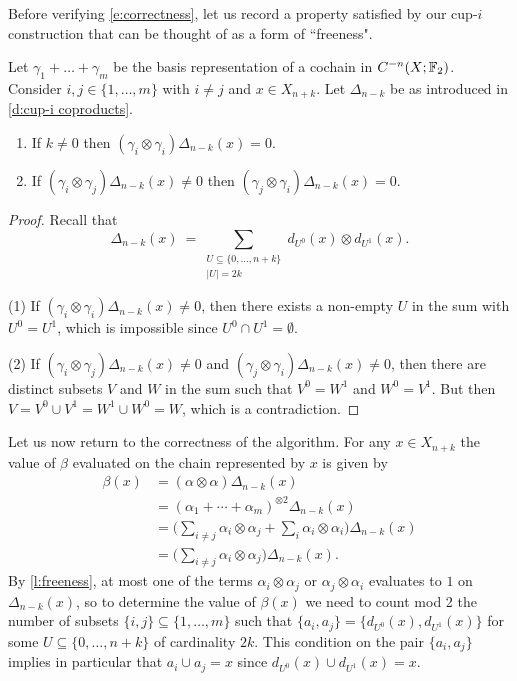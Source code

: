 Before verifying \eqref{e:correctness}, let us record a property satisfied by our cup-$i$ construction that can be thought of as a form of ``freeness".

\begin{lemma} \label{l:freeness}
	Let $\gamma_1 + \dots + \gamma_m$ be the basis representation of a cochain in $C^{-n}(X; {\mathbb{F}_2})$.
	Consider $i, j \in \{1, \dots, m\}$ with $i \neq j$ and $x \in X_{n+k}$.
	Let $\Delta_{n-k}$ be as introduced in \cref{d:cup-i coproducts}.
	\begin{enumerate}
		\item If $k \neq 0$ then $(\gamma_i \otimes \gamma_i)\Delta_{n-k}(x) = 0$.
		\item If $(\gamma_i \otimes \gamma_j)\Delta_{n-k}(x) \neq 0$ then $(\gamma_j \otimes \gamma_i)\Delta_{n-k}(x) = 0$.
	\end{enumerate}
\end{lemma}

\begin{proof}
	Recall that
	\begin{equation*}
	\Delta_{n-k}(x) \ = \! \sum_{\substack{U \subseteq \{0, \dots, n+k\} \\ \vert U \vert = 2k}}
	d_{U^0}(x) \otimes d_{U^1}(x).
	\end{equation*}

	(1) If $(\gamma_i \otimes \gamma_i)\Delta_{n-k}(x) \neq 0$, then there exists a non-empty $U$ in the sum with $U^0 = U^1$, which is impossible since $U^0 \cap U^1 = \emptyset$.

	(2) If $(\gamma_i \otimes \gamma_j)\Delta_{n-k}(x) \neq 0$ and $(\gamma_j \otimes \gamma_i)\Delta_{n-k}(x) \neq 0$, then there are distinct subsets $V$ and $W$ in the sum such that $V^0 = W^1$ and $W^0 = V^1$.
	But then $V = V^0 \cup V^1 = W^1 \cup W^0 = W$, which is a contradiction.
\end{proof}

Let us now return to the correctness of the algorithm.
For any $x \in X_{n+k}$ the value of $\beta$ evaluated on the chain represented by $x$ is given by
\begin{align*}
\beta(x) & =
(\alpha \otimes \alpha) \Delta_{n-k}(x) \\ & =
(\alpha_1 + \cdots + \alpha_m)^{\otimes 2} \Delta_{n-k}(x) \\ & =
\Big(\sum_{i \neq j} \alpha_i \otimes \alpha_j + \sum_{i} \alpha_i \otimes \alpha_i \Big)
\Delta_{n-k}(x) \\ & =
\Big(\sum_{i \neq j} \alpha_i \otimes \alpha_j\Big)
\Delta_{n-k}(x).
\end{align*}
By \cref{l:freeness}, at most one of the terms $\alpha_i \otimes \alpha_j$ or $\alpha_j \otimes \alpha_i$ evaluates to $1$ on $\Delta_{n-k}(x)$, so to determine the value of $\beta(x)$ we need to count mod 2 the number of subsets $\{i,j\} \subseteq \{1,\dots, m\}$ such that $\{a_i, a_j\} = \{d_{U^0}(x), d_{U^1}(x)\}$ for some $U \subseteq \{0, \dots, n+k\}$ of cardinality $2k$.
This condition on the pair $\{a_i, a_j\}$ implies in particular that $a_i \cup a_j = x$ since $d_{U^0}(x) \cup d_{U^1}(x) = x$.


